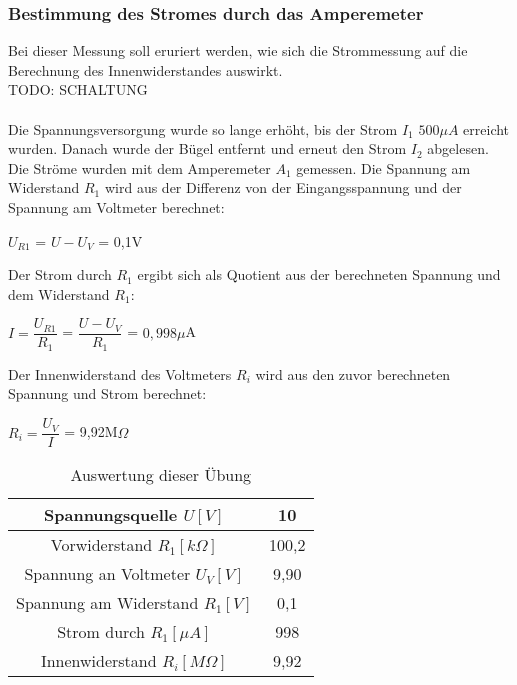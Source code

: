 \subsubsection{Bestimmung des Stromes durch das Amperemeter}
Bei dieser Messung soll eruriert werden, wie sich die Strommessung auf die Berechnung des Innenwiderstandes auswirkt.
~\\
TODO: SCHALTUNG		\\
~\\
Die Spannungsversorgung wurde so lange erhöht, bis der Strom $I_1$ $500\mu A$ erreicht wurden. Danach wurde der Bügel entfernt und erneut den Strom $I_2$ abgelesen. Die Ströme wurden mit dem Amperemeter $A_1$ gemessen.
Die Spannung am Widerstand $R_1$ wird aus der Differenz von der Eingangsspannung und der Spannung am Voltmeter berechnet:
\begin{center}
$U_{R1}$ = $U - U_V$ = 0,1V
\end{center}
Der Strom durch $R_1$ ergibt sich als Quotient aus der berechneten Spannung und dem Widerstand $R_1$:
\begin{center}
$I = \dfrac{U_{R1}}{R_1}$ = $\dfrac{U - U_V}{R_1}$ = $0,998\mu$A
\end{center}
Der Innenwiderstand des Voltmeters $R_i$ wird aus den zuvor berechneten Spannung und Strom berechnet:
\begin{center}
$R_i = \dfrac{U_V}{I}$ = 9,92M$\Omega$
\end{center}
\begin{table}[h]
	\centering
	\begin{tabular}{|c|c|}
	\hline 
	Spannungsquelle $U [V]$			& 10 		\\ 
	\hline 
	Vorwiderstand $R_1 [k\Omega]$		& 100,2	\\ 
	\hline 
	Spannung an Voltmeter $U_V [V]$ 	& 9,90	\\ 
	\hline 
	Spannung am Widerstand $R_1 [V]$	& 0,1		\\ 
	\hline 
	Strom durch $R_1 [\mu A]$		& 998		\\ 
	\hline 
	Innenwiderstand $R_i [M\Omega]$	& 9,92	\\ 
	\hline 
	\end{tabular}
	\caption{Auswertung dieser Übung}
\end{table}


